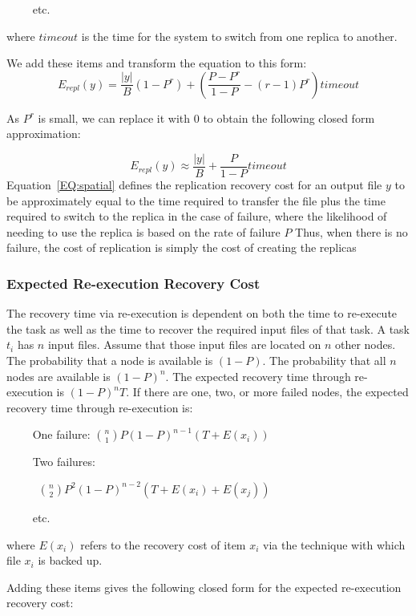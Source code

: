 \documentclass{sig-alternate}
\begin{document}
\noindent ~~~~ etc.

\noindent where $timeout$ is the time for the system to switch from one replica to another.

We add these items and transform the equation to this form:
\begin{equation}
E_{repl}(y) = \frac{|y|}{B}\left(1-P^r\right) + \left(\frac{P-P^r}{1-P}-(r-1)P^r\right)timeout
\end{equation}

As $P^r$ is small, we can replace it with $0$ to obtain the following closed form approximation:

\begin{equation}
E_{repl}(y) \approx \frac{|y|}{B}+\frac{P}{1-P}timeout
\label{EQ:spatial}
\end{equation}
Equation~\ref{EQ:spatial} defines the replication recovery cost for an output file $y$ to be approximately 
equal to the time required to transfer the file plus the time required to switch to the replica
in the case of failure, where the likelihood of needing to use the replica is based on the rate of failure $P$
Thus, when there is no failure, the cost of replication is simply the cost of creating the replicas

\subsubsection{Expected Re-execution Recovery Cost}
The recovery time via re-execution is dependent on both the time to re-execute the task as well
as the time to recover the required input files of that task. 
A task $t_i$ has $n$ input files. Assume that those input files are located on $n$ other nodes.
The probability that a node is available is $(1-P)$. The probability that all $n$ nodes are available is $(1-P)^n$.
The expected recovery time through re-execution is
$(1-P)^nT$. 
If there are one, two, or more failed nodes, the expected recovery time through re-execution is:

\noindent ~~~~ One failure:
%
${n \choose 1}P(1-P)^{n-1}(T+E(x_i))$

\noindent ~~~~ Two failures:

~~~~~ ${n \choose 2}P^2(1-P)^{n-2}(T+E(x_i)+E(x_j))$

\noindent ~~~~ etc.

\noindent where ${E(x_i)}$ refers to the recovery cost of item ${x_i}$ via the technique with which file ${x_i}$ is backed up. 


Adding these items gives the following closed form for the expected re-execution recovery cost:
\end{document}
